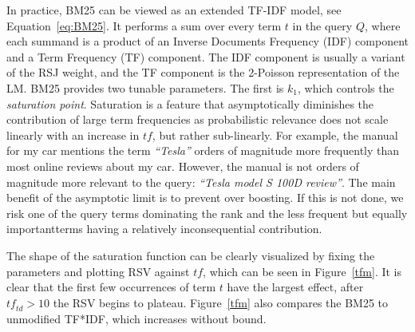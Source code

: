 In practice, BM25 can be viewed as an extended TF-IDF model, see Equation~\ref{eq:BM25}. It performs a sum over every term $t$ in the query $Q$, where each summand is a product of an Inverse Documents Frequency (IDF) component and a Term Frequency (TF) component. 
The IDF component is usually a variant of the RSJ weight, and the TF component is the 2-Poisson representation of the LM. BM25 provides two tunable parameters. The first is $k_1$, which controls the \textit{saturation point}. Saturation is a feature that asymptotically diminishes the contribution of large term frequencies as probabilistic relevance does not scale linearly with an increase in $\mathit{tf}$, but rather sub-linearly. For example, the manual for my car mentions the term \textit{``Tesla''} orders of magnitude more frequently than most online reviews about my car. However, the manual is not orders of magnitude more relevant to the query: \textit{``Tesla model S 100D review''}. The main benefit of the asymptotic limit is to prevent over boosting. If this is not done, we risk one of the query terms dominating the rank and the less frequent \textemdash but equally important\textemdash terms having a relatively inconsequential contribution. 

The shape of the saturation function can be clearly visualized by fixing the parameters and plotting RSV against $\mathit{tf}$, which can be seen in Figure~\ref{tfm}. It is clear that the first few occurrences of term $t$ have the largest effect, after $\mathit{tf}_{\!\!td} > 10$ the RSV begins to plateau. Figure~\ref{tfm} also compares the BM25 to unmodified TF*IDF, which increases without bound.


